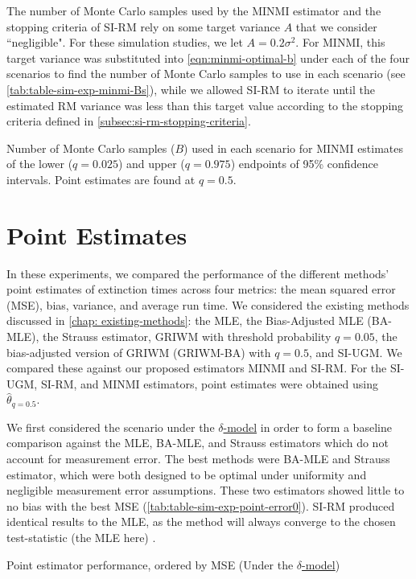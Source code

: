 The number of Monte Carlo samples used by the MINMI estimator and the stopping criteria of SI-RM rely on some target variance $A$ that we consider ``negligible". For these simulation studies, we let $A = 0.2\sigma^2$. For MINMI, this target variance was substituted into \autoref{eqn:minmi-optimal-b} under each of the four scenarios to find the number of Monte Carlo samples to use in each scenario (see \autoref{tab:table-sim-exp-minmi-Bs}), while we allowed SI-RM to iterate until the estimated RM variance was less than this target value according to the stopping criteria defined in \autoref{subsec:si-rm-stopping-criteria}.
\begin{table}[ht]
    \centering
    \caption{Number of Monte Carlo samples ($B$) used in each scenario for MINMI estimates of the lower ($q=0.025$) and upper ($q=0.975$) endpoints of 95\% confidence intervals. Point estimates are found at $q = 0.5$.}
    \vspace{4mm}
    
    \label{tab:table-sim-exp-minmi-Bs}
    \vspace{-4mm}
\end{table}

\section{Point Estimates}

In these experiments, we compared the performance of the different methods' point estimates of extinction times across four metrics: the mean squared error (MSE), bias, variance, and average run time. We considered the existing methods discussed in \autoref{chap: existing-methods}: the MLE, the Bias-Adjusted MLE (BA-MLE), the Strauss estimator, GRIWM with threshold probability $q=0.05$, the bias-adjusted version of GRIWM (GRIWM-BA) with $q=0.5$, and SI-UGM. We compared these against our proposed estimators MINMI and SI-RM. For the SI-UGM, SI-RM, and MINMI estimators, point estimates were obtained using $\hat\theta_{q=0.5}$.

We first considered the scenario under the \hyperref[model: no-measurement-error]{$\delta$-model} in order to form a baseline comparison against the MLE, BA-MLE, and Strauss estimators which do not account for measurement error. The best methods were BA-MLE and Strauss estimator, which were both designed to be optimal under uniformity and negligible measurement error assumptions. These two estimators showed little to no bias with the best MSE (\autoref{tab:table-sim-exp-point-error0}). SI-RM produced identical results to the MLE, as the method will always converge to the chosen test-statistic (the MLE here) \cite{Garthwaite1992}.
\begin{table}[ht]
    \centering
    \caption{Point estimator performance, ordered by MSE (Under the \hyperref[model: no-measurement-error]{$\delta$-model})}
    
    \label{tab:table-sim-exp-point-error0}
\end{table}

